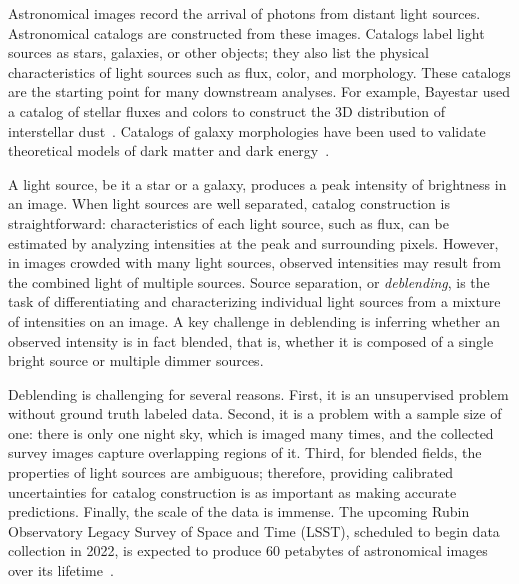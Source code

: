 Astronomical images record the arrival of photons from distant light sources. 
Astronomical catalogs are constructed from these images.
Catalogs label light sources as stars, galaxies, or other objects; they also list the physical characteristics of light sources such as flux, color, and morphology. 
These catalogs are the starting point for many downstream analyses.
For example, Bayestar used a catalog of stellar fluxes and colors to construct the 3D distribution of interstellar dust~\cite{Green_2019_argonaut}. 
Catalogs of galaxy morphologies have been used to validate theoretical models of dark matter and dark energy~\cite{Abbott2018}. 

A light source, be it a star or a galaxy, produces a peak intensity of brightness in an image. 
When light sources are well separated, catalog construction is straightforward: characteristics of each light source, such as flux, can be estimated by analyzing intensities at the peak and surrounding pixels. 
However, in images crowded with many light sources, observed intensities may result from the combined light of multiple sources.
Source separation, or {\itshape deblending}, is the task of differentiating and characterizing individual light sources from a mixture of intensities on an image. 
A key challenge in deblending is inferring whether an observed intensity is in fact blended, that is, whether it is composed of a single bright source or multiple dimmer sources. 


Deblending is challenging for several reasons.
First, it is an unsupervised problem without ground truth labeled data. 
Second, it is a problem with a sample size of one: there is only one night sky, which is imaged many times, and the collected survey images capture overlapping regions of it.
Third, for blended fields, the properties of light sources are ambiguous; therefore, providing calibrated uncertainties for catalog construction is as important as making accurate predictions.
Finally, the scale of the data is immense. 
The upcoming Rubin Observatory Legacy Survey of Space and Time (LSST), scheduled to begin data collection in 2022, is expected to produce 60 petabytes of astronomical images over its lifetime~\cite{LSST_about}.

